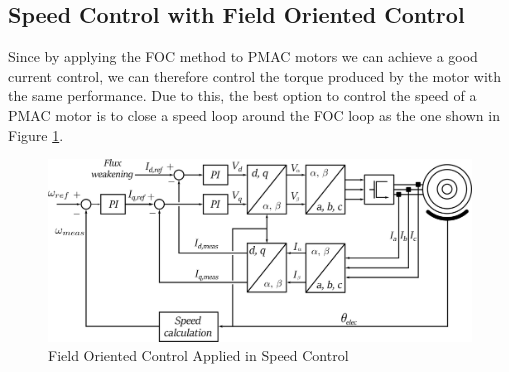 \subsection{Speed Control with Field Oriented Control}

Since by applying the \ac{FOC} method to \ac{PMAC} motors we can achieve a good current control, we can therefore control the torque produced by the motor with the same performance. Due to this, the best option to control the speed of a \ac{PMAC} motor is to close a speed loop around the \ac{FOC} loop as the one shown in Figure \ref{fig:foc_speed}.

\begin{figure}[htbp]
\centering
\includegraphics[width=12cm]{Images/foc_speed.png} 
\caption[Field Oriented Control applied in Speed Control]{Field Oriented Control Applied in Speed Control}
\label{fig:foc_speed}
\end{figure}
